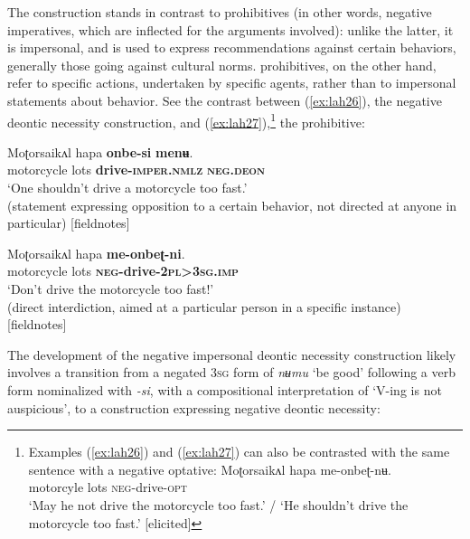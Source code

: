 \documentclass[output=paper,colorlinks,citecolor=brown]{langscibook}
\begin{document}
The construction stands in contrast to prohibitives (in other words, negative imperatives, which are inflected for the arguments involved): unlike the latter, it is impersonal, and is used to express recommendations against certain behaviors, generally those going against cultural norms.  prohibitives, on the other hand, refer to specific actions, undertaken by specific agents, rather than to impersonal statements about behavior. See the contrast between (\ref{ex:lah26}), the negative deontic necessity construction, and (\ref{ex:lah27}),\footnote{Examples (\ref{ex:lah26}) and (\ref{ex:lah27}) can also be contrasted with the same sentence with a negative optative:
\ea \label{footnoteex4} 
\gll Moʈorsaikʌl hapa me-onbeʈ-nʉ. \\
motorcyle lots \textsc{neg}-drive-\textsc{opt} \\
\glt `May he not drive the motorcycle too fast.' / `He shouldn't drive the motorcycle too fast.' [elicited]
\z} the prohibitive:


\ea \label{ex:lah26}
\gll Moʈorsaikʌl hapa \textbf{onbe-si} \textbf{menʉ}. \\
motorcycle lots \textbf{drive-\textsc{imper.nmlz}} \textbf{\textsc{neg.deon}} \\
\glt `One shouldn't drive a motorcycle too fast.' \\ (statement expressing opposition to a certain behavior, not directed at anyone in particular) [fieldnotes]
\z


\ea \label{ex:lah27}
\gll Moʈorsaikʌl hapa \textbf{me-onbeʈ-ni}. \\
motorcycle lots \textbf{\textsc{neg}-drive-\textsc{2pl>3sg.imp}} \\
\glt `Don't drive the motorcycle too fast!' \\
(direct interdiction, aimed at a particular person in a specific instance) [fieldnotes]
\z

 The development of the negative impersonal deontic necessity construction likely involves a transition from a negated \textsc{3sg} form of \textit{nʉmu} `be good' following a verb form nominalized with \textit{-si}, with a compositional interpretation of `V-ing is not auspicious', to a construction expressing negative deontic necessity: 




\end{document}
